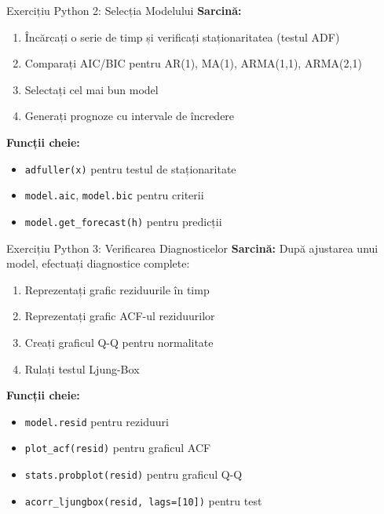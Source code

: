 \documentclass[9pt, aspectratio=169, t]{beamer}
\begin{document}
\begin{frame}{Exercițiu Python 2: Selecția Modelului}
    \textbf{Sarcină:}
    \begin{enumerate}
        \item Încărcați o serie de timp și verificați staționaritatea (testul ADF)
        \item Comparați AIC/BIC pentru AR(1), MA(1), ARMA(1,1), ARMA(2,1)
        \item Selectați cel mai bun model
        \item Generați prognoze cu intervale de încredere
    \end{enumerate}

    \vspace{0.3cm}
    \textbf{Funcții cheie:}
    \begin{itemize}
        \item \texttt{adfuller(x)} pentru testul de staționaritate
        \item \texttt{model.aic}, \texttt{model.bic} pentru criterii
        \item \texttt{model.get\_forecast(h)} pentru predicții
    \end{itemize}

\end{frame}

\begin{frame}{Exercițiu Python 3: Verificarea Diagnosticelor}
    \textbf{Sarcină:} După ajustarea unui model, efectuați diagnostice complete:
    \begin{enumerate}
        \item Reprezentați grafic reziduurile în timp
        \item Reprezentați grafic ACF-ul reziduurilor
        \item Creați graficul Q-Q pentru normalitate
        \item Rulați testul Ljung-Box
    \end{enumerate}

    \vspace{0.3cm}
    \textbf{Funcții cheie:}
    \begin{itemize}
        \item \texttt{model.resid} pentru reziduuri
        \item \texttt{plot\_acf(resid)} pentru graficul ACF
        \item \texttt{stats.probplot(resid)} pentru graficul Q-Q
        \item \texttt{acorr\_ljungbox(resid, lags=[10])} pentru test
    \end{itemize}

\end{frame}
\end{document}

